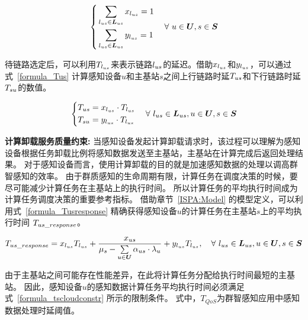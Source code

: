 \begin{equation}
  \label{formula_xusl1}
  \left\{
    \begin{aligned}
    &\sum_{l_{us} \in \boldsymbol{L}_{us}}x_{l_{us}} = 1\\
    &\sum_{l_{us} \in \boldsymbol{L}_{us}}y_{l_{us}} = 1
    \end{aligned}
  \right.
  \quad \forall \ u\in \boldsymbol{U}, s\in \boldsymbol{S}
\end{equation}

待链路选定后，可以利用$T_{l_{us}}$来表示链路$l_{us}$的延迟。借助$x_{l_{us}}$和$y_{l_{us}}$，可以通过式~\eqref{formula_Tus} 计算感知设备$u$和主基站$s$之间上行链路时延${T}_{us}$和下行链路时延${T}_{su}$的数值。

\begin{equation}
  \label{formula_Tus}
  \left\{
    \begin{aligned}
    &{T}_{us} = x_{l_{us}} \cdot T_{l_{us}}\\
    &{T}_{su} = y_{l_{us}} \cdot T_{l_{us}}
    \end{aligned}
  \right.
  \quad \forall \ l_{us} \in \boldsymbol{L}_{us}, u\in \boldsymbol{U}, s\in \boldsymbol{S}
\end{equation}

\textbf{计算卸载服务质量约束:}
当感知设备发起计算卸载请求时，该过程可以理解为感知设备根据任务卸载比例将感知数据发送至主基站，主基站在计算完成后返回处理结果。
对于感知设备而言，使用计算卸载的目的就是加速感知数据的处理以调高群智感知的效率。
由于群质感知的生命周期有限，计算任务在调度决策的时候，要尽可能减少计算任务在主基站上的执行时间。
所以计算任务的平均执行时间成为计算任务调度决策的重要参考指标。
借助章节~\ref{ISPA:Model} 的模型定义，可以利用式~\eqref{formula_Tusresponse} 精确获得感知设备$u$的计算任务在主基站$s$上的平均执行时间 ${T}_{us\_response}$。


\begin{equation}
\label{formula_Tusresponse}
\begin{gathered}
{T}_{us\_response} = x_{l_{us}} T_{l_{us}} + \frac{{x}_{us}}{{\mu}_{s}-\sum\limits_{u \in \boldsymbol{U}}{\alpha}_{us} \cdot {\lambda}_{u}} + y_{l_{us}} T_{l_{us}},
\quad \forall \ l_{us} \in \boldsymbol{L}_{us}, u\in \boldsymbol{U}, s\in \boldsymbol{S}
\end{gathered}
\end{equation}

由于主基站之间可能存在性能差异，在此将计算任务分配给执行时间最短的主基站。
因此，感知设备$u$的感知数据计算任务平均执行时间必须满足式~\eqref{formula_tscloudconstr} 所示的限制条件。
式中，$T_{QoS}$为群智感知应用中感知数据处理时延阈值。

